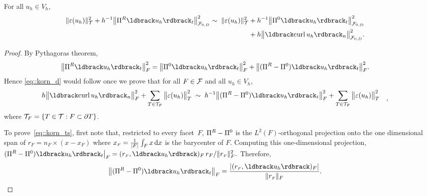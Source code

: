 \begin{lemma}\label{lemma::korn}
  For all $u_h \in V_h$,
  \begin{align}
    \begin{split}\label{eq::korn_d}
       \|\eps(u_h)\|_\mesh^2
       +
       h^{-1}\big\|\PiR\jump{u_h}_t\big\|_{{\facets_{0, D}}}^2
       \sim\;
       \|\eps(u_h)\|_\mesh^2
       & + 
        h^{-1}\big\|\Pi^0\jump{u_h}_t\big\|_{{\facets_{0, D}}}^2
        \\
        & 
      + h\big\|\jump{\curl u_h}_n\big\|_{{\facets_{0, D}}}^2.
    \end{split}
  \end{align}
\end{lemma}

\begin{proof}
  By Pythagoras theorem, 
  \[\big\|\PiR \jump{u_h}_t\big\|^2_F =
  \big\|\Pi^0\jump{u_h}_t\big\|^2_F +
  \big\|(\PiR-\Pi^0)\jump{u_h}_t\big\|^2_F.\]
  Hence  \eqref{eq::korn_d} would follow
  once we prove that for all $F \in \mathcal{F}$ and all $u_h \in V_h$, 
  \begin{equation}\label{eq::korn_ts}
    \begin{split}
    h\big\|\jump{\curl u_h}_n&\big\|_F^2
    + \sum_{T \in \T_F}\big\|\eps(u_h)\big\|^2_T 
    \;\sim\;
    h^{-1}\big\|(\PiR-\Pi^0)\jump{u_h}_t\big\|_F^2
    + \sum_{T\in \T_F}\big\|\eps(u_h)\big\|^2_T
    \end{split},
  \end{equation}
  where $\mathcal{T}_F = \{ T \in \mathcal{T}: F \subset \partial T\}$.

  To
  prove~\eqref{eq::korn_ts}, first note that, restricted to every
  facet~$F$, ${\Pi^{R}}-\Pi^0$ is the $L^2(F)$-orthogonal projection onto
  the one dimensional span of $r_F = n_F \times (x - x_F)$ where
  ${x_{\scriptscriptstyle F}}=\frac{1}{|F|}\int_Fx\mathop{\mathrm{d} x}$ is the barycenter of
  $F$.
  Computing this one-dimensional projection,
  $(\PiR-\Pi^0)\jump{u_h}_t\big|_{F}
  = (\rF, \jump{u_h})_F \,r_F/\|\rF\|_F^2.$
  Therefore,
  \begin{equation}
    \label{eq::korn_pis_equality}
    \big\|(\PiR-\Pi^0)\jump{u_h}_t\big\|_F
    = \frac{|(\rF, \jump{u_h})_F|}{\|\rF\|_F}.
  \end{equation}
  

\end{proof}
